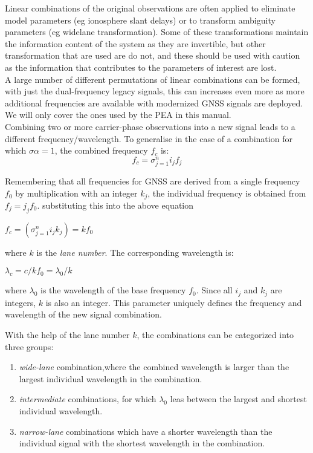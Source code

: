 Linear combinations of the original observations are often applied to eliminate model parameters (eg ionosphere slant delays) or to transform ambiguity parameters (eg widelane transformation). Some of these transformations maintain the information content of the system as they are invertible, but other transformation that are used are do not, and these should be used with caution as the information that contributes to the parameters of interest are lost.\\
%
A large number of different permutations of linear combinations can be formed, with just the dual-frequency legacy signals, this can increases even more as more additional frequencies are available with modernized GNSS signals are deployed. We will only cover the ones used by the PEA in this manual.\\
%
Combining two or more carrier-phase observations into a new signal leads to a different frequency/wavelength. To generalise in the case of a combination for which $\sigma \alpha = 1$, the combined frequency $f_c$ is:
\begin{equation}
f_c = \sigma_{j=1}^n i_j f_j 
\label{eq:comb_freq}
\end{equation}

Remembering that all frequencies for GNSS are derived from a single frequency $f_0$ by multiplication with an integer $k_j$, the individual frequency is obtained from $f_j = j_jf_0$. substituting this into the above equation

$f_c = (\sigma_{j=1}^n i_j k_j) = kf_0$ \label{eq:}

where $k$ is the \emph{lane number}. The corresponding wavelength is:

$\lambda_c = c / kf_0 = \lambda_0 / k$ 

where $\lambda_0$ is the wavelength of the base frequency $f_0$. Since all $i_j$ and $k_j$ are integers, $k$ is also an integer. This parameter uniquely defines the frequency and wavelength of the new signal combination.

With the help of the lane number $k$, the combinations can be categorized into three groups:
\begin{enumerate}
    \item \emph{wide-lane} combination,where the combined wavelength is larger than the largest individual wavelength in the combination.
    \item \emph{intermediate} combinations, for which $\lambda_0$ leas between the largest and shortest individual wavelength.
    \item \emph{narrow-lane} combinations which have a shorter wavelength than the individual signal with the shortest wavelength in the combination.
\end{enumerate}

